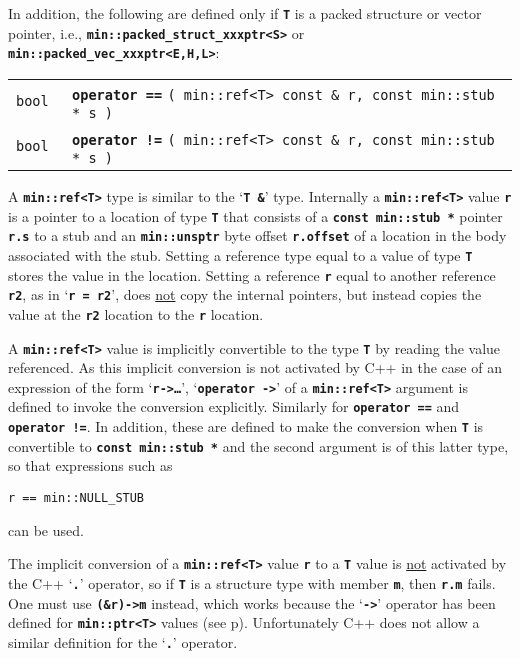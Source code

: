 \documentclass[12pt]{article}
\makeatletter
\newcommand{\TT}[1]{{\tt \bfseries #1}}
\newcommand{\ttomkey}[3]{\TT{operator #2}\index{#1@{\tt operator #2}!{#3}}}
\newcommand{\pagref}[1]{p\pageref{#1}}
\newcommand{\EOL}{\penalty \exhyphenpenalty}
\newenvironment{indpar}[1][0.3in]%
	{\begin{list}{}%
		     {\setlength{\itemsep}{0in}%
		      \setlength{\topsep}{0in}%
		      \setlength{\parsep}{1ex}%
		      \setlength{\labelwidth}{#1}%
		      \setlength{\leftmargin}{#1}%
		      \addtolength{\leftmargin}{\labelsep}}%
	 \item}%
	{\end{list}}
\newcommand{\LABEL}[1]{\label{#1}}
\newcommand{\TTOMKEY}[3]{\ttomkey{#1}{#2}{#3}}
\makeatother
\begin{document}
In addition, the following are defined
only if \TT{T} is a packed structure or vector pointer,
i.e., \TT{min::\EOL packed\_\EOL struct\_\EOL xxxptr<S>} or
\TT{min::\EOL packed\_\EOL vec\_\EOL xxxptr<E,H,L>}:

\begin{indpar}\begin{tabular}{r@{}l}
\verb|bool |
    & \TTOMKEY{==}{==}{of {\tt min::ref<T>}}
      \verb|( min::ref<T> const & r, const min::stub * s )|
\LABEL{MIN::==REF_AND_STUB} \\
\verb|bool |
    & \TTOMKEY{!=}{!=}{of {\tt min::ref<T>}}
      \verb|( min::ref<T> const & r, const min::stub * s )|
\LABEL{MIN::!=REF_AND_STUB} \\
\end{tabular}\end{indpar}

A \TT{min::ref<T>} type is similar to the `\TT{T \&}' type.
Internally a \TT{min::ref<T>} value \TT{r}
is a pointer to a location of type \TT{T} that
consists of a \TT{const min::\EOL stub~*} pointer \TT{r.s} to a stub
and an \TT{min::\EOL unsptr} byte offset \TT{r.offset}
of a location in the body
associated with the stub.  Setting a reference type equal to a value
of type \TT{T} stores the value in the location.  Setting a reference
\TT{r} equal to another reference \TT{r2}, as in `\TT{r~=~r2}', does
\underline{not} copy the internal pointers, but instead copies the
value at the \TT{r2} location to the \TT{r} location.

A \TT{min::ref<T>} value is implicitly convertible to the type \TT{T}
by reading the value referenced.
As this implicit conversion
is not activated by C++ in the case of an expression of the form
`\TT{r->\ldots}'\label{REF->},
`\TT{operator~->}' of a \TT{min::\EOL ref<T>}
argument is defined to invoke the conversion explicitly.
Similarly for \TT{operator ==} and \TT{operator !=}.
In addition, these are defined to make the conversion when
\TT{T} is convertible to \TT{const min::\EOL stub~*} and the
second argument is of this latter type, so that expressions such as
\begin{center}
\tt r == min::NULL\_STUB
\end{center}
can be used.

The implicit conversion of a \TT{min::\EOL ref<T>} value \TT{r} to a \TT{T}
value is \underline{not} activated by the C++ `\TT{.}' operator,
so if \TT{T} is a structure type with member \TT{m}, then \TT{r.m}
fails.  One must use \TT{(\&r)->m} instead, which works because
the `\TT{->}' operator has been defined for \TT{min::\EOL ptr<T>}
values (see \pagref{PTR->}).
Unfortunately C++ does not allow a similar definition for the
`\TT{.}' operator.
\end{document}
